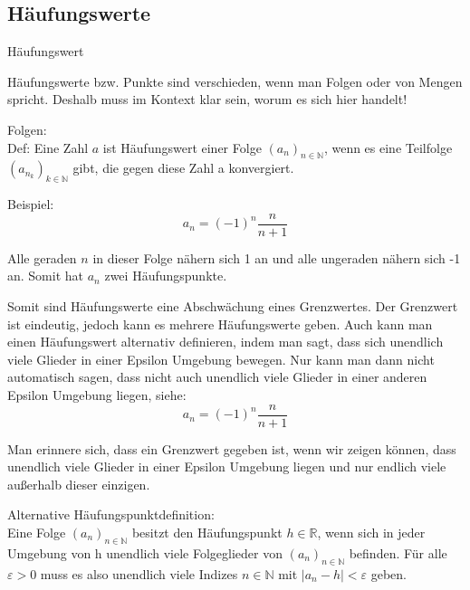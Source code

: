 \documentclass[headsepline,12pt,a4paper]{scrartcl}
\begin{document}
\newpage

\subsection*{Häufungswerte}


\begin{center}
\item[Häufungswert]
\end{center}
\item Häufungswerte bzw. Punkte sind verschieden, wenn man Folgen oder von Mengen spricht. Deshalb muss im Kontext klar sein, worum es sich hier handelt! \\
\item Folgen: \\

Def: Eine Zahl $a$ ist Häufungswert einer Folge $(a_n)_{n\in \mathbb{N}}$, wenn es eine Teilfolge $(a_{n_k} )_{k\in \mathbb{N}}$ gibt, die gegen diese Zahl a konvergiert. \\

\item Beispiel: \\
$$ a_n= (-1)^n \frac{n}{n+1} $$ 

Alle geraden $n$ in dieser Folge nähern sich 1 an und alle ungeraden nähern sich -1 an. Somit hat $a_n$ zwei Häufungspunkte.

\item Somit sind Häufungswerte eine Abschwächung eines Grenzwertes. Der Grenzwert ist eindeutig, jedoch kann es mehrere Häufungswerte geben. Auch kann man einen Häufungswert alternativ definieren, indem man sagt, dass sich unendlich viele Glieder in einer Epsilon Umgebung bewegen. Nur kann man dann nicht automatisch sagen, dass nicht auch unendlich viele Glieder in einer anderen Epsilon Umgebung liegen, siehe: \\ 



$$ a_n= (-1)^n \frac{n}{n+1} $$ 

Man erinnere sich, dass ein Grenzwert gegeben ist, wenn wir zeigen können, dass unendlich viele Glieder in einer Epsilon Umgebung liegen und nur endlich viele außerhalb dieser einzigen. \\

\item Alternative Häufungspunktdefinition: \\

Eine Folge $(a_n)_{n\in \mathbb{N}}$ besitzt den Häufungspunkt $h\in \mathbb{R}$, wenn sich in jeder Umgebung von h unendlich viele Folgeglieder von $(a_n)_{n \in \mathbb{N}} $ befinden. Für alle 
$ \varepsilon > 0 $ muss es also unendlich viele Indizes $ n \in \mathbb{N} $ mit $|a_n - h | < \varepsilon $ geben.
\end{document}
